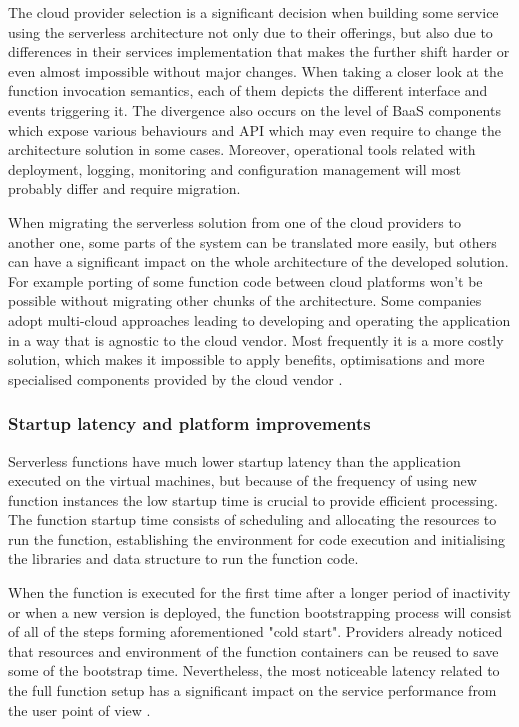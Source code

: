 The cloud provider selection is a significant decision when building some service using the serverless architecture not only due to their offerings, but also due to differences in their services implementation that makes the further shift harder or even almost impossible without major changes. When taking a closer look at the function invocation semantics, each of them depicts the different interface and events triggering it. The divergence also occurs on the level of BaaS components which expose various behaviours and API which may even require to change the architecture solution in some cases. Moreover, operational tools related with deployment, logging, monitoring and configuration management will most probably differ and require migration.

When migrating the serverless solution from one of the cloud providers to another one, some parts of the system can be translated more easily, but others can have a significant impact on the whole architecture of the developed solution. For example porting of some function code between cloud platforms won't be possible without migrating other chunks of the architecture. Some companies adopt multi-cloud approaches leading to developing and operating the application in a way that is agnostic to the cloud vendor. Most frequently it is a more costly solution, which makes it impossible to apply benefits, optimisations and more specialised components provided by the cloud vendor \cite{MartinFowlerServerless}.

\subsubsection*{Startup latency and platform improvements}

Serverless functions have much lower startup latency than the application executed on the virtual machines, but because of the frequency of using new function instances the low startup time is crucial to provide efficient processing. The function startup time consists of scheduling and allocating the resources to run the function, establishing the environment for code execution and initialising the libraries and data structure to run the function code.

When the function is executed for the first time after a longer period of inactivity or when a new version is deployed, the function bootstrapping process will consist of all of the steps forming aforementioned "cold start". Providers already noticed that resources and environment of the function containers can be reused to save some of the bootstrap time. Nevertheless, the most noticeable latency related to the full function setup has a significant impact on the service performance from the user point of view \cite{BerkeleyServerless}.

